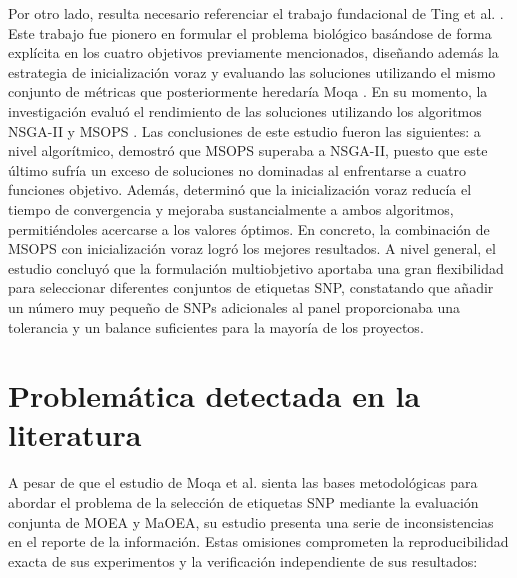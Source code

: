 Por otro lado, resulta necesario referenciar el trabajo fundacional de Ting et al. \cite{ting2010multi}. Este trabajo fue pionero en formular el problema biológico basándose de forma explícita en los cuatro objetivos previamente mencionados, diseñando además la estrategia de inicialización voraz y evaluando las soluciones utilizando el mismo conjunto de métricas que posteriormente heredaría Moqa \cite{moqa2022assessing}. En su momento, la investigación evaluó el rendimiento de las soluciones utilizando los algoritmos NSGA-II \cite{deb2002fast} y MSOPS \cite{hughes2003msops}. Las conclusiones de este estudio fueron las siguientes: a nivel algorítmico, demostró que MSOPS superaba a NSGA-II, puesto que este último sufría un exceso de soluciones no dominadas al enfrentarse a cuatro funciones objetivo. Además, determinó que la inicialización voraz reducía el tiempo de convergencia y mejoraba sustancialmente a ambos algoritmos, permitiéndoles acercarse a los valores óptimos. En concreto, la combinación de MSOPS con inicialización voraz logró los mejores resultados. A nivel general, el estudio concluyó que la formulación multiobjetivo aportaba una gran flexibilidad para seleccionar diferentes conjuntos de etiquetas SNP, constatando que añadir un número muy pequeño de SNPs adicionales al panel proporcionaba una tolerancia y un balance suficientes para la mayoría de los proyectos.

\section{Problemática detectada en la literatura}

A pesar de que el estudio de Moqa et al. \cite{moqa2022assessing} sienta las bases metodológicas para abordar el problema de la selección de etiquetas SNP mediante la evaluación conjunta de MOEA y MaOEA, su estudio presenta una serie de inconsistencias en el reporte de la información. Estas omisiones comprometen la reproducibilidad exacta de sus experimentos y la verificación independiente de sus resultados:

